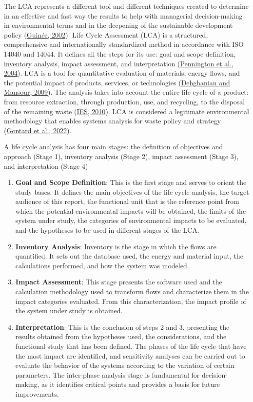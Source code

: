 \documentclass[12pt]{elsarticle} %
\begin{document}
The LCA represents a different tool and different techniques created to determine in an effective and fast way the results to help with managerial decision-making in environmental terms and in the deepening of the sustainable development policy (\protect\hyperlink{ref-guinee2002}{Guinée, 2002}).
Life Cycle Assessment (LCA) is a structured, comprehensive and internationally standardized method in accordance with ISO 14040 and 14044.
It defines all the steps for its use: goal and scope definition, inventory analysis, impact assessment, and interpretation (\protect\hyperlink{ref-pennington2004}{Pennington et al., 2004}).
LCA is a tool for quantitative evaluation of materials, energy flows, and the potential impact of products, services, or technologies (\protect\hyperlink{ref-dehghanian2009}{Dehghanian and Mansour, 2009}).
The analysis takes into account the entire life cycle of a product: from resource extraction, through production, use, and recycling, to the disposal of the remaining waste (\protect\hyperlink{ref-ILCD2011}{IES, 2010}).
LCA is considered a legitimate environmental methodology that enables systems analysis for waste policy and strategy (\protect\hyperlink{ref-gontard2022}{Gontard et al., 2022}).

A life cycle analysis has four main stages:
the definition of objectives and approach (Stage 1), inventory analysis (Stage 2), impact assessment (Stage 3), and interpretation (Stage 4)

\begin{enumerate}
\def\labelenumi{\arabic{enumi}.}
\item
  \textbf{Goal and Scope Definition}: This is the first stage and serves to orient the study bases. It defines the main objectives of the life cycle analysis, the target audience of this report, the functional unit that is the reference point from which the potential environmental impacts will be obtained, the limits of the system under study, the categories of environmental impacts to be evaluated, and the hypotheses to be used in different stages of the LCA.
\item
  \textbf{Inventory Analysis}: Inventory is the stage in which the flows are quantified. It sets out the database used, the energy and material input, the calculations performed, and how the system was modeled.
\item
  \textbf{Impact Assessment}: This stage presents the software used and the calculation methodology used to transform flows and characterize them in the impact categories evaluated. From this characterization, the impact profile of the system under study is obtained.
\item
  \textbf{Interpretation}: This is the conclusion of steps 2 and 3, presenting the results obtained from the hypotheses used, the considerations, and the functional study that has been defined. The phases of the life cycle that have the most impact are identified, and sensitivity analyses can be carried out to evaluate the behavior of the systems according to the variation of certain parameters. The inter-phase analysis stage is fundamental for decision-making, as it identifies critical points and provides a basis for future improvements.
\end{enumerate}
\end{document}
